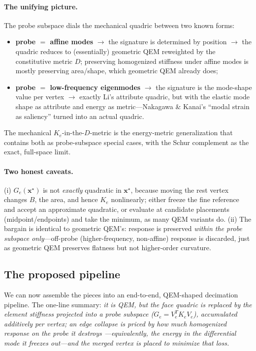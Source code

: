 \paragraph{The unifying picture.}
The probe subspace dials the mechanical quadric between two known forms:
\begin{itemize}
  \item \textbf{probe $=$ affine modes} $\rightarrow$ the signature is determined by position $\rightarrow$ the quadric reduces to (essentially) geometric QEM reweighted by the constitutive metric $D$; preserving homogenized stiffness under affine modes is mostly preserving area/shape, which geometric QEM already does;
  \item \textbf{probe $=$ low-frequency eigenmodes} $\rightarrow$ the signature is the mode-shape value per vertex $\rightarrow$ exactly Li's attribute quadric, but with the elastic mode shape as attribute and energy as metric---Nakagawa \& Kanai's ``modal strain as saliency'' turned into an actual quadric.
\end{itemize}
The mechanical $K_e$-in-the-$D$-metric is the energy-metric generalization that contains both as probe-subspace special cases, with the Schur complement as the exact, full-space limit.

\paragraph{Two honest caveats.}
(i) $G_e(\mathbf{x}^\star)$ is not \emph{exactly} quadratic in $\mathbf{x}^\star$, because moving the rest vertex changes $B$, the area, and hence $K_e$ nonlinearly; either freeze the fine reference and accept an approximate quadratic, or evaluate at candidate placements (midpoint/endpoints) and take the minimum, as many QEM variants do.
(ii) The bargain is identical to geometric QEM's: response is preserved \emph{within the probe subspace only}---off-probe (higher-frequency, non-affine) response is discarded, just as geometric QEM preserves flatness but not higher-order curvature.

\subsection{The proposed pipeline}

We can now assemble the pieces into an end-to-end, QEM-shaped decimation pipeline.
The one-line summary: \emph{it is QEM, but the face quadric is replaced by the element stiffness projected into a probe subspace ($G_e = V_e^T K_e V_e$), accumulated additively per vertex; an edge collapse is priced by how much homogenized response on the probe it destroys ---equivalently, the energy in the differential mode it freezes out---and the merged vertex is placed to minimize that loss.}

